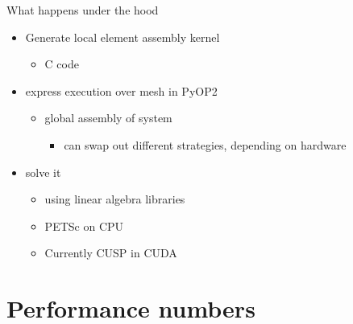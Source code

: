 \documentclass[bigger]{beamer}
\begin{document}
\begin{frame}[label={sec:orgheadline20}]{What happens under the hood}
\begin{itemize}
\item Generate local element assembly kernel
\begin{itemize}
\item C code
\end{itemize}
\item express execution over mesh in PyOP2
\begin{itemize}
\item global assembly of system
\begin{itemize}
\item can swap out different strategies, depending on hardware
\end{itemize}
\end{itemize}
\item solve it
\begin{itemize}
\item using linear algebra libraries
\item PETSc on CPU
\item Currently CUSP in CUDA
\end{itemize}
\end{itemize}
\end{frame}

\section{Performance numbers}
\label{sec:orgheadline26}
\end{document}
